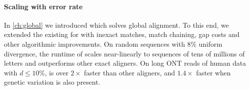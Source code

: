 \paragraph{Scaling with error rate}
In \cref{ch:global} we introduced \astarpa which solves global alignment. To
this end, we extended the existing \sh for \A with inexact matches, match
chaining, gap costs and other algorithmic improvements. On random sequences with
$8\%$ uniform divergence, the runtime of \astarpa scales near-linearly to
sequences of tens of millions of letters and outperforms other exact aligners.
On long ONT reads of human data with $d{\leq}10\%$, \astarpa is over $2\times$
faster than other aligners, and $1.4\times$ faster when genetic variation is
also present.